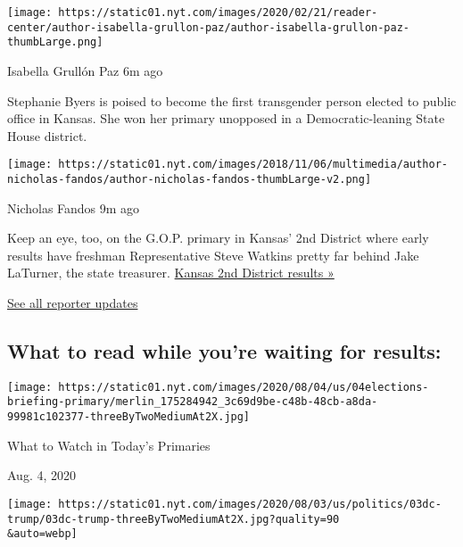 \texttt{[image: https://static01.nyt.com/images/2020/02/21/reader-center/author-isabella-grullon-paz/author-isabella-grullon-paz-thumbLarge.png]}

Isabella Grullón Paz 6m ago

Stephanie Byers is poised to become the first transgender person elected
to public office in Kansas. She won her primary unopposed in a
Democratic-leaning State House district.

\texttt{[image: https://static01.nyt.com/images/2018/11/06/multimedia/author-nicholas-fandos/author-nicholas-fandos-thumbLarge-v2.png]}

Nicholas Fandos 9m ago

Keep an eye, too, on the G.O.P. primary in Kansas' 2nd District where
early results have freshman Representative Steve Watkins pretty far
behind Jake LaTurner, the state treasurer.
\href{https://www.nytimes.com/interactive/2020/08/04/us/elections/results-kansas-house-district-2-primary-election.html?action=click\&module=ELEX_results\&pgtype=Interactive\&region=ReporterUpdates}{Kansas
2nd District results »}

\href{https://www.nytimes.com/interactive/2020/08/04/us/elections/live-analysis-arizona-kansas-michigan-missouri-primaries.html?action=click\&module=ELEX_results\&pgtype=Interactive\&region=Component}{See
all reporter updates}

\hypertarget{what-to-read-while-youre-waiting-for-results}{%
\subsection{What to read while you're waiting for
results:}\label{what-to-read-while-youre-waiting-for-results}}

\href{https://www.nytimes.com/2020/08/04/us/elections/primary-election-michigan-arizona-kansas.html?action=click\&module=ELEX_results\&pgtype=Interactive\&region=RelatedCoverage}{}

\texttt{[image: https://static01.nyt.com/images/2020/08/04/us/04elections-briefing-primary/merlin\_175284942\_3c69d9be-c48b-48cb-a8da-99981c102377-threeByTwoMediumAt2X.jpg]}

What to Watch in Today's Primaries

Aug. 4, 2020

\href{https://www.nytimes.com/2020/08/03/us/politics/trump-mail-in-voting.html?action=click\&module=ELEX_results\&pgtype=Interactive\&region=RelatedCoverage}{}

\texttt{[image: https://static01.nyt.com/images/2020/08/03/us/politics/03dc-trump/03dc-trump-threeByTwoMediumAt2X.jpg?quality=90\\\&auto=webp]}

